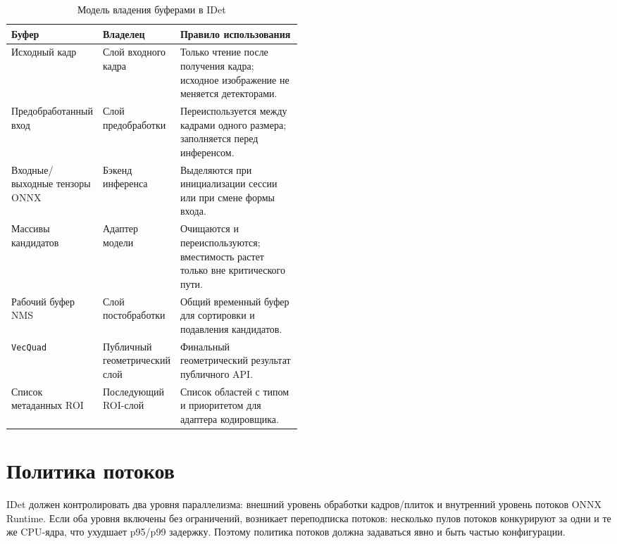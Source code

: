 \documentclass[12pt,a4paper,oneside,openany]{report}
\begin{document}
\begin{table}[!htbp]
  \centering
  \caption{Модель владения буферами в IDet}
  \label{tab:buffer_ownership}
  \small
  \begin{tabularx}{\linewidth}{@{}P{0.24\linewidth}P{0.24\linewidth}Y@{}}
    \toprule
    Буфер & Владелец & Правило использования \\
    \midrule
    Исходный кадр &
    Слой входного кадра &
    Только чтение после получения кадра; исходное изображение не меняется детекторами. \\
    Предобработанный вход &
    Слой предобработки &
    Переиспользуется между кадрами одного размера; заполняется перед инференсом. \\
    Входные/выходные тензоры ONNX &
    Бэкенд инференса &
    Выделяются при инициализации сессии или при смене формы входа. \\
    Массивы кандидатов &
    Адаптер модели &
    Очищаются и переиспользуются; вместимость растет только вне критического пути. \\
    Рабочий буфер NMS &
    Слой постобработки &
    Общий временный буфер для сортировки и подавления кандидатов. \\
    \texttt{VecQuad} &
    Публичный геометрический слой &
    Финальный геометрический результат публичного API. \\
    Список метаданных ROI &
    Последующий ROI-слой &
    Список областей с типом и приоритетом для адаптера кодировщика. \\
    \bottomrule
  \end{tabularx}
\end{table}


\section{Политика потоков}

IDet должен контролировать два уровня параллелизма: внешний уровень обработки кадров/плиток и
внутренний уровень потоков ONNX Runtime. Если оба уровня включены без ограничений, возникает
переподписка потоков: несколько пулов потоков конкурируют за одни и те же CPU-ядра, что ухудшает
p95/p99 задержку. Поэтому политика потоков должна задаваться явно и быть частью конфигурации.
\end{document}
